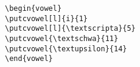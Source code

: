 \begin{frame}[fragile]
\begin{columns}
\begin{column}{.35\textwidth}
\end{column}

\end{columns}



\begin{columns}

\begin{column}{.65\textwidth}
{\footnotesize
\begin{lstlisting}
\begin{vowel}
\putcvowel[l]{i}{1}
\putcvowel[l]{\textscripta}{5}
\putcvowel{\textschwa}{11}
\putcvowel{\textupsilon}{14}
\end{vowel}
\end{lstlisting}
}

\end{column}
\begin{column}{.35\textwidth}

\begin{vowel}
\end{vowel}

\end{column}

\end{columns}

\end{frame}


